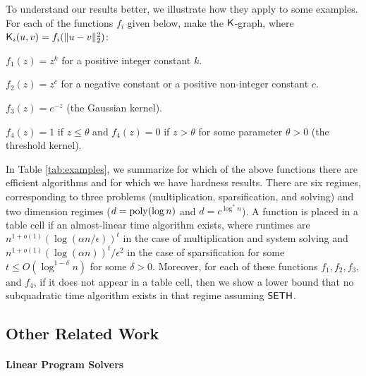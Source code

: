 To understand our results better, we illustrate how they apply to some examples. For each of the functions $f_i$ given below, make the $\mathsf{K}$-graph, where $\mathsf{K}_i(u,v) = f_i(\|u-v\|_2^2)$:

\begin{compactenum}
\item $f_1(z) = z^k$ for a positive integer constant $k$.
\item $f_2(z) = z^c$ for a negative constant or a positive non-integer constant $c$.
\item $f_3(z) = e^{-z}$ (the Gaussian kernel).
\item $f_4(z) = 1$ if $z\le \theta$ and $f_4(z) = 0$ if $z > \theta$ for some parameter $\theta > 0$ (the threshold kernel).
\end{compactenum}




In Table \ref{tab:examples}, we summarize for which of the above functions there are efficient algorithms and for which we have hardness results. There are six regimes, corresponding to three problems (multiplication, sparsification, and solving) and two dimension regimes ($d = \mathrm{poly}(\log n)$ and $d = c^{\log^* n}$). A function is placed in a table cell if an almost-linear time algorithm exists, where runtimes are $n^{1+o(1)}(\log(\alpha n/\epsilon))^t$ in the case of multiplication and system solving and $n^{1+o(1)}(\log(\alpha n))^t/\epsilon^2$ in the case of sparsification for some $t\le O(\log^{1-\delta} n)$ for some $\delta > 0$. Moreover, for each of these functions $f_1, f_2, f_3,$ and $f_4$, if it does not appear in a table cell, then we show a lower bound that no subquadratic time algorithm exists in that regime assuming $\mathsf{SETH}$.




\subsection{Other Related Work} \label{subsec:relatedwork}

\paragraph*{Linear Program Solvers}

